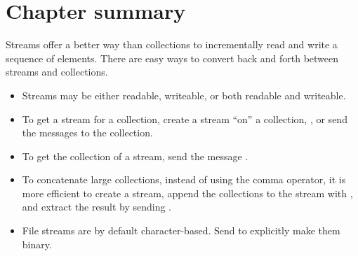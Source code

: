 \documentclass[a4paper,10pt,twoside]{book}
\begin{document}
\section{Chapter summary}

Streams offer a better way than collections to incrementally read and write a sequence of elements.
There are easy ways to convert back and forth between streams and collections.

\begin{itemize}
	\item Streams may be either readable, writeable, or both readable and writeable.
	\item To get a stream for a collection, create a stream ``on'' a collection, \eg {}, or send the messages  \etc to the collection.
	\item To get the collection of a stream, send the message .
	\item To concatenate large collections, instead of using the comma operator, it is more efficient to create a stream, append the collections to the stream with , and extract the result by sending .
  \item File streams are by default character-based.
  Send  to explicitly make them binary.
\end{itemize}

\ifx\wholebook\relax\else
\end{document}
